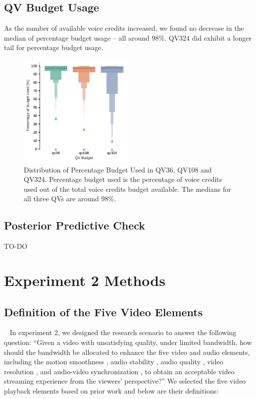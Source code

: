 \subsection{QV Budget Usage}
As the number of available voice credits increased, we found no decrease in the median of percentage budget usage -- all around 98\%. QV324 did exhibit a longer tail for percentage budget usage.
\begin{figure}[htpb]
    \centering
    \includegraphics[width=0.5\textwidth, keepaspectratio=true]{content/image/qv_budget_used_distribution.pdf}
    \caption{
      Distribution of Percentage Budget Used in QV36, QV108 and QV324. Percentage budget used is the percentage of voice credits used out of the total voice credits budget available. The medians for all three QVs are around 98\%.
    }
    \label{fig:qv_budget_exp1}
\end{figure}

\subsection{Posterior Predictive Check}
TO-DO

\section{Experiment 2 Methods}

\subsection{Definition of the Five Video Elements}~\label{elem_def}
In experiment 2, we designed the research scenario to answer the following question: ``Given a video with unsatisfying quality, under limited bandwidth, how should the bandwidth be allocated to enhance the five video and audio elements, including the motion smoothness \cite{huynh2008temporal}, audio stability \cite{hardman1998successful}, audio quality \cite{knoche2008low}, video resolution \cite{knoche2005can}, and audio-video synchronization \cite{steinmetz1996human}, to obtain an acceptable video streaming experience from the viewers' perspective?'' We selected the five video playback elements based on prior work and below are their definitions: 

